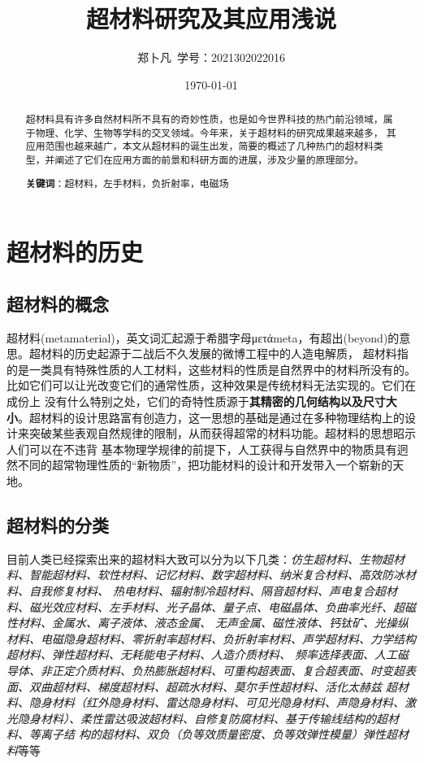 \documentclass[UTF8]{ctexart}
\title{超材料研究及其应用浅说}
\author[]{郑卜凡\ 学号：2021302022016}
\affil[]{武汉大学物理科学与技术学院}
\date{\today}
\begin{document}
\maketitle
\begin{abstract}
超材料具有许多自然材料所不具有的奇妙性质，也是如今世界科技的热门前沿领域，属于物理、化学、生物等学科的交叉领域。今年来，关于超材料的研究成果越来越多，
其应用范围也越来越广，本文从超材料的诞生出发，简要的概述了几种热门的超材料类型，并阐述了它们在应用方面的前景和科研方面的进展，涉及少量的原理部分。


\textbf{关键词}：超材料，左手材料，负折射率，电磁场
\end{abstract}

\section{超材料的历史}
\subsection{超材料的概念}
超材料(metamaterial)，英文词汇起源于希腊字母μετάmeta，有超出(beyond)的意思。超材料的历史起源于二战后不久发展的微博工程中的人造电解质，
超材料指的是一类具有特殊性质的人工材料，这些材料的性质是自然界中的材料所没有的。比如它们可以让光改变它们的通常性质，这种效果是传统材料无法实现的。它们在成份上
没有什么特别之处，它们的奇特性质源于\textbf{其精密的几何结构以及尺寸大小}\cite{wiki1}。超材料的设计思路富有创造力，这一思想的基础是通过在多种物理结构上的设计来突破某些表观自然规律的限制，从而获得超常的材料功能。超材料的思想昭示人们可以在不违背
基本物理学规律的前提下，人工获得与自然界中的物质具有迥然不同的超常物理性质的“新物质”，把功能材料的设计和开发带入一个崭新的天地。
\subsection{超材料的分类}
目前人类已经探索出来的超材料大致可以分为以下几类：\textit{仿生超材料、生物超材料、智能超材料、软性材料、记忆材料、数字超材料、纳米复合材料、高效防冰材料、自我修复材料、
热电材料、辐射制冷超材料、隔音超材料、声电复合超材料、磁光效应材料、左手材料、光子晶体、量子点、电磁晶体、负曲率光纤、超磁性材料、金属水、离子液体、液态金属、
无声金属、磁性液体、钙钛矿、光操纵材料、电磁隐身超材料、零折射率超材料、负折射率材料、声学超材料、力学结构超材料、弹性超材料、无耗能电子材料、人造介质材料、
频率选择表面、人工磁导体、非正定介质材料、负热膨胀超材料、可重构超表面、复合超表面、时变超表面、双曲超材料、梯度超材料、超疏水材料、莫尔手性超材料、活化太赫兹
超材料、隐身材料（红外隐身材料、雷达隐身材料、可见光隐身材料、声隐身材料、激光隐身材料）、柔性雷达吸波超材料、自修复防腐材料、基于传输线结构的超材料、等离子结
构的超材料、双负（负等效质量密度、负等效弹性模量）弹性超材料}等等\cite{wiki1}
\end{document}
